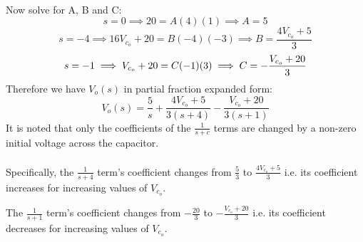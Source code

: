 \begin{enumerate}
{\begin{align*}
		\end{align*}
		Now solve for A, B and C:
		\begin{equation*}
			s = 0 \implies 20 = A(4)(1) \implies A = 5
		\end{equation*}
		\begin{equation*}
			s = -4 \implies 16 V_{c_o} + 20 = B(-4)(-3) \implies B = \frac{4 V_{c_o} + 5}{3}
		\end{equation*}
		\begin{equation*}
			s = -1 \implies V_{c_o} + 20 = C(-1)(3) \implies C = -\frac{V_{c_o} + 20}{3} \\
		\end{equation*}
		Therefore we have $V_o(s)$ in partial fraction expanded form:
		\begin{equation*}
			V_o(s) = \frac{5}{s} + \frac{4 V_{c_o} + 5}{3(s+4)} -\frac{V_{c_o} + 20}{3 (s+1)}
		\end{equation*}
		It is noted that only the coefficients of the $\frac{1}{s+c}$ terms are changed by a non-zero initial voltage across the capacitor.
		\\ \\
		Specifically, the $\frac{1}{s+4}$ term's coefficient changes from $\frac{5}{3}$ to $\frac{4 V_{c_o} + 5}{3}$ i.e. its coefficient increases for increasing values of $V_{c_o}$.\footnotemark[1]
		\par
		The $\frac{1}{s+1}$ term's coefficient changes from $-\frac{20}{3}$ to $-\frac{V_{c_o} + 20}{3}$ i.e. its coefficient decreases for increasing values of $V_{c_o}$.\footnotemark[1]
		\\
	}

\end{enumerate}

